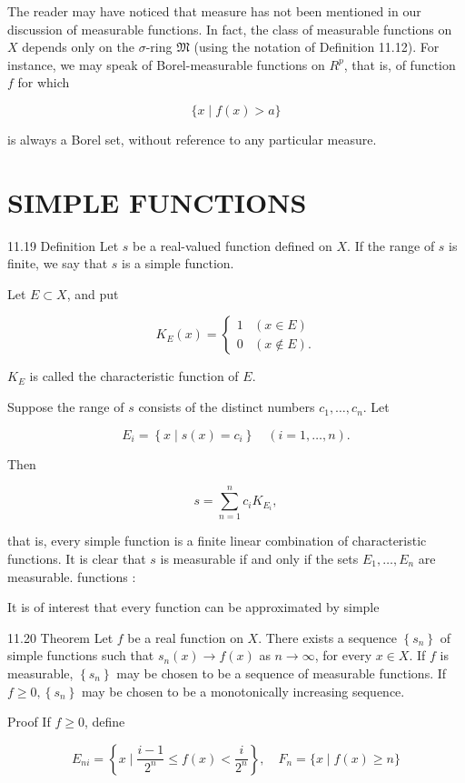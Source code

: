 \documentclass[10pt]{article}
\begin{document}
The reader may have noticed that measure has not been mentioned in our discussion of measurable functions. In fact, the class of measurable functions on $X$ depends only on the $\sigma$-ring $\mathfrak{M}$ (using the notation of Definition 11.12). For instance, we may speak of Borel-measurable functions on $R^{p}$, that is, of function $f$ for which

$$
\{x \mid f(x)>a\}
$$

is always a Borel set, without reference to any particular measure.

\section{SIMPLE FUNCTIONS}
11.19 Definition Let $s$ be a real-valued function defined on $X$. If the range of $s$ is finite, we say that $s$ is a simple function.

Let $E \subset X$, and put

$$
K_{E}(x)= \begin{cases}1 & (x \in E) \\ 0 & (x \notin E) .\end{cases}
$$

$K_{E}$ is called the characteristic function of $E$.

Suppose the range of $s$ consists of the distinct numbers $c_{1}, \ldots, c_{n}$. Let

$$
E_{i}=\left\{x \mid s(x)=c_{i}\right\} \quad(i=1, \ldots, n) .
$$

Then

$$
s=\sum_{n=1}^{n} c_{i} K_{E_{i}},
$$

that is, every simple function is a finite linear combination of characteristic functions. It is clear that $s$ is measurable if and only if the sets $E_{1}, \ldots, E_{n}$ are measurable. functions :

It is of interest that every function can be approximated by simple

11.20 Theorem Let $f$ be a real function on $X$. There exists a sequence $\left\{s_{n}\right\}$ of simple functions such that $s_{n}(x) \rightarrow f(x)$ as $n \rightarrow \infty$, for every $x \in X$. If $f$ is measurable, $\left\{s_{n}\right\}$ may be chosen to be a sequence of measurable functions. If $f \geq 0,\left\{s_{n}\right\}$ may be chosen to be a monotonically increasing sequence.

Proof If $f \geq 0$, define

$$
E_{n i}=\left\{x \mid \frac{i-1}{2^{n}} \leq f(x)<\frac{i}{2^{n}}\right\}, \quad F_{n}=\{x \mid f(x) \geq n\}
$$
\end{document}

